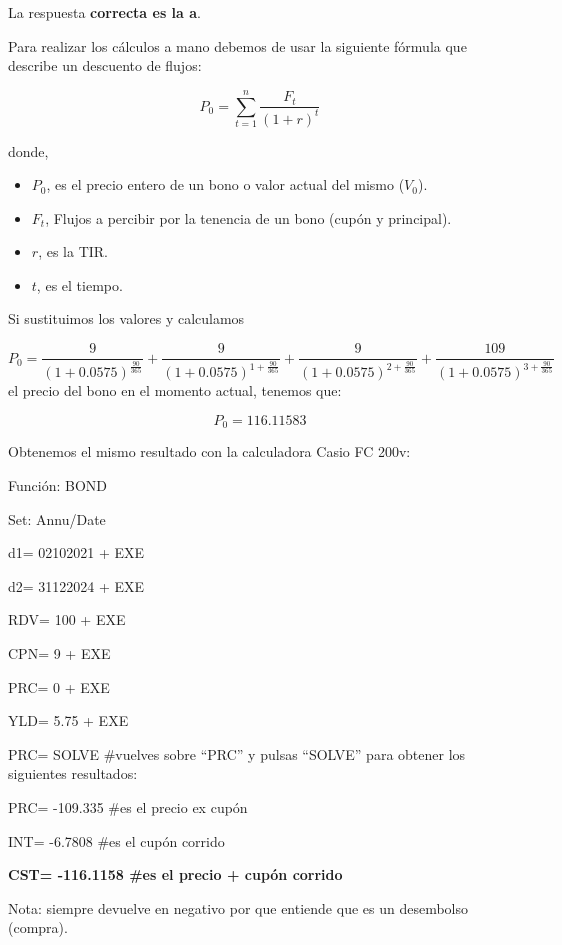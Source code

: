 \documentclass[
  letterpaper,
  DIV=11,
  numbers=noendperiod]{scrartcl}
\begin{document}
\begin{tcolorbox}[enhanced jigsaw, colframe=quarto-callout-tip-color-frame, opacityback=0, opacitybacktitle=0.6, colback=white, leftrule=.75mm, bottomtitle=1mm, colbacktitle=quarto-callout-tip-color!10!white, coltitle=black, toprule=.15mm, left=2mm, breakable, toptitle=1mm, titlerule=0mm, title=\textcolor{quarto-callout-tip-color}{\faLightbulb}\hspace{0.5em}{Solución}, arc=.35mm, rightrule=.15mm, bottomrule=.15mm]

La respuesta \textbf{correcta es la a}.

Para realizar los cálculos a mano debemos de usar la siguiente fórmula
que describe un descuento de flujos:

\[P_0=\sum_{ t=1}^{ n}\frac{F_t}{(1+r)^{t}}\]

donde,

\begin{itemize}
\item
  \(P_0\), es el precio entero de un bono o valor actual del mismo
  (\(V_0\)).
\item
  \(F_t\), Flujos a percibir por la tenencia de un bono (cupón y
  principal).
\item
  \(r\), es la TIR.
\item
  \(t\), es el tiempo.
\end{itemize}

Si sustituimos los valores y calculamos

\[P_0=\frac{9}{\left(1+0.0575\right)^{\frac{90}{365}}}+\frac{9}{\left(1+0.0575\right)^{1+\frac{90}{365}}}+\frac{9}{\left(1+0.0575\right)^{2+\frac{90}{365}}}+\frac{109}{\left(1+0.0575\right)^{3+\frac{90}{365}}}\]
el precio del bono en el momento actual, tenemos que:

\[P_0=116.11583\]

Obtenemos el mismo resultado con la calculadora Casio FC 200v:

Función: BOND

Set: Annu/Date

d1= 02102021 + EXE

d2= 31122024 + EXE

RDV= 100 + EXE

CPN= 9 + EXE

PRC= 0 + EXE

YLD= 5.75 + EXE

PRC= SOLVE \#vuelves sobre ``PRC'' y pulsas ``SOLVE'' para obtener los
siguientes resultados:

PRC= -109.335 \#es el precio ex cupón

INT= -6.7808 \#es el cupón corrido

\textbf{CST= -116.1158 \#es el precio + cupón corrido}

Nota: siempre devuelve en negativo por que entiende que es un desembolso
(compra).

\end{tcolorbox}
\end{document}
